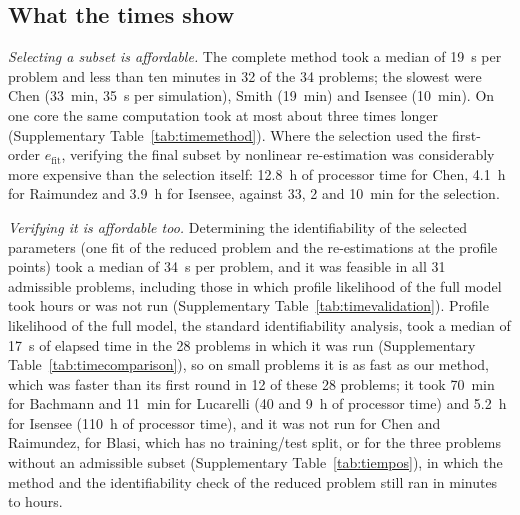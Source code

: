 \subsection*{What the times show}
\emph{Selecting a subset is affordable.} The complete method took a median of 19~s per problem and less than ten minutes in 32 of the 34 problems; the slowest were Chen (33~min, 35~s per simulation), Smith (19~min) and Isensee (10~min). On one core the same computation took at most about three times longer (Supplementary Table~\ref{tab:timemethod}). Where the selection used the first-order $e_{\mathrm{fit}}$, verifying the final subset by nonlinear re-estimation was considerably more expensive than the selection itself: 12.8~h of processor time for Chen, 4.1~h for Raimundez and 3.9~h for Isensee, against 33, 2 and 10~min for the selection.

\emph{Verifying it is affordable too.} Determining the identifiability of the selected parameters (one fit of the reduced problem and the re-estimations at the profile points) took a median of 34~s per problem, and it was feasible in all 31 admissible problems, including those in which profile likelihood of the full model took hours or was not run (Supplementary Table~\ref{tab:timevalidation}). Profile likelihood of the full model, the standard identifiability analysis, took a median of 17~s of elapsed time in the 28 problems in which it was run (Supplementary Table~\ref{tab:timecomparison}), so on small problems it is as fast as our method, which was faster than its first round in 12 of these 28 problems; it took 70~min for Bachmann and 11~min for Lucarelli (40 and 9~h of processor time) and 5.2~h for Isensee (110~h of processor time), and it was not run for Chen and Raimundez, for Blasi, which has no training/test split, or for the three problems without an admissible subset (Supplementary Table~\ref{tab:tiempos}), in which the method and the identifiability check of the reduced problem still ran in minutes to hours.

